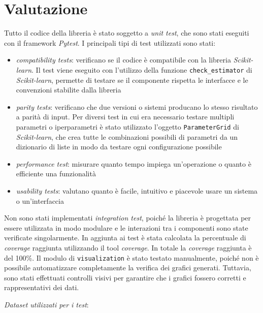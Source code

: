 \chapter{Valutazione}

Tutto il codice della libreria è stato soggetto a \textit{unit test}, che sono stati eseguiti con il framework \textit{Pytest}. I principali tipi di test utilizzati sono stati:

\begin{itemize}
    \item \textit{compatibility tests}: verificano se il codice è compatibile con la libreria \textit{Scikit-learn}. Il test viene eseguito con l'utilizzo della funzione \texttt{check\_estimator} di \textit{Scikit-learn}, permette di testare se il componente rispetta le interfacce e le convenzioni stabilite dalla libreria
    \item \textit{parity tests}: verificano che due versioni o sistemi producano lo stesso risultato a parità di input. Per diversi test in cui era necessario testare multipli parametri o iperparametri è stato utilizzato l'oggetto \texttt{ParameterGrid} di \textit{Scikit-learn}, che crea tutte le combinazioni possibili di parametri da un dizionario di liste in modo da testare ogni configurazione possibile
    \item \textit{performance test}: misurare quanto tempo impiega un'operazione o quanto è efficiente una funzionalità
    \item \textit{usability tests}: valutano quanto è facile, intuitivo e piacevole usare un sistema o un'interfaccia
\end{itemize}

Non sono stati implementati \textit{integration test}, poiché la libreria è progettata per essere utilizzata in modo modulare e le interazioni tra i componenti sono state verificate singolarmente. In aggiunta ai test è stata calcolata la percentuale di \textit{coverage} raggiunta utilizzando il tool \textit{coverage}. In totale la \textit{coverage} raggiunta è del 100\%. Il modulo di \texttt{visualization} è stato testato manualmente, poiché non è possibile automatizzare completamente la verifica dei grafici generati. Tuttavia, sono stati effettuati controlli visivi per garantire che i grafici fossero corretti e rappresentativi dei dati.

\textit{Dataset utilizzati per i test}:

